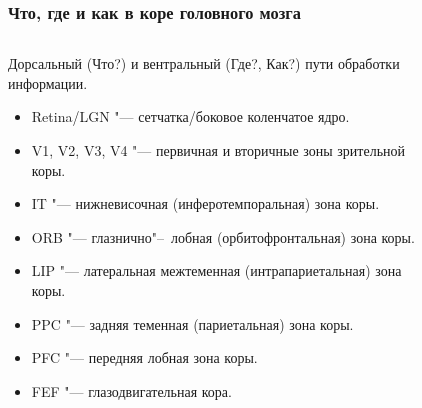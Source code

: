 \documentclass[default]{beamer}
\begin{document}
	\begin{frame}
		\frametitle{Что, где и как в коре головного мозга}
		
		\begin{columns}
			\begin{column}{0.6\textwidth}
				\footnotesize
				Дорсальный (Что?) и вентральный (Где?, Как?) пути обработки информации.
				\begin{itemize}
					\item Retina/LGN "--- сетчатка/боковое коленчатое ядро.
					\item V1, V2, V3, V4 "--- первичная и вторичные зоны зрительной коры.
					\item IT "--- нижневисочная (инферотемпоральная) зона коры.
					\item ORB "--- глазнично"--~лобная (орбитофронтальная) зона коры.
					\item LIP "--- латеральная межтеменная (интрапариетальная) зона коры.
					\item PPC "--- задняя теменная (париетальная) зона коры.
					\item PFC "--- передняя лобная зона коры.
					\item FEF "--- глазодвигательная кора.
				\end{itemize}
			\end{column}
			\begin{column}{0.4\textwidth}
				\vspace*{-5mm}
				\begin{figure}

\end{figure}
\end{column}
\end{columns}
\end{frame}
\end{document}
